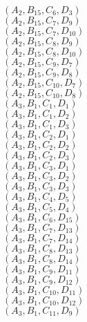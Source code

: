 \documentclass[14pt]{article}
\begin{document}
    $({A}_{2}, {B}_{15}, {C}_{6}, {D}_{3}) $ \\ 
    $({A}_{2}, {B}_{15}, {C}_{7}, {D}_{9}) $ \\ 
    $({A}_{2}, {B}_{15}, {C}_{7}, {D}_{10}) $ \\ 
    $({A}_{2}, {B}_{15}, {C}_{8}, {D}_{9}) $ \\ 
    $({A}_{2}, {B}_{15}, {C}_{8}, {D}_{10}) $ \\ 
    $({A}_{2}, {B}_{15}, {C}_{9}, {D}_{7}) $ \\ 
    $({A}_{2}, {B}_{15}, {C}_{9}, {D}_{8}) $ \\ 
    $({A}_{2}, {B}_{15}, {C}_{10}, {D}_{7}) $ \\ 
    $({A}_{2}, {B}_{15}, {C}_{10}, {D}_{8}) $ \\ 
    $({A}_{3}, {B}_{1}, {C}_{1}, {D}_{1}) $ \\ 
    $({A}_{3}, {B}_{1}, {C}_{1}, {D}_{2}) $ \\ 
    $({A}_{3}, {B}_{1}, {C}_{1}, {D}_{3}) $ \\ 
    $({A}_{3}, {B}_{1}, {C}_{2}, {D}_{1}) $ \\ 
    $({A}_{3}, {B}_{1}, {C}_{2}, {D}_{2}) $ \\ 
    $({A}_{3}, {B}_{1}, {C}_{2}, {D}_{3}) $ \\ 
    $({A}_{3}, {B}_{1}, {C}_{3}, {D}_{1}) $ \\ 
    $({A}_{3}, {B}_{1}, {C}_{3}, {D}_{2}) $ \\ 
    $({A}_{3}, {B}_{1}, {C}_{3}, {D}_{3}) $ \\ 
    $({A}_{3}, {B}_{1}, {C}_{4}, {D}_{5}) $ \\ 
    $({A}_{3}, {B}_{1}, {C}_{5}, {D}_{4}) $ \\ 
    $({A}_{3}, {B}_{1}, {C}_{6}, {D}_{15}) $ \\ 
    $({A}_{3}, {B}_{1}, {C}_{7}, {D}_{13}) $ \\ 
    $({A}_{3}, {B}_{1}, {C}_{7}, {D}_{14}) $ \\ 
    $({A}_{3}, {B}_{1}, {C}_{8}, {D}_{13}) $ \\ 
    $({A}_{3}, {B}_{1}, {C}_{8}, {D}_{14}) $ \\ 
    $({A}_{3}, {B}_{1}, {C}_{9}, {D}_{11}) $ \\ 
    $({A}_{3}, {B}_{1}, {C}_{9}, {D}_{12}) $ \\ 
    $({A}_{3}, {B}_{1}, {C}_{10}, {D}_{11}) $ \\ 
    $({A}_{3}, {B}_{1}, {C}_{10}, {D}_{12}) $ \\ 
    $({A}_{3}, {B}_{1}, {C}_{11}, {D}_{9}) $ \\ 
\end{document}
